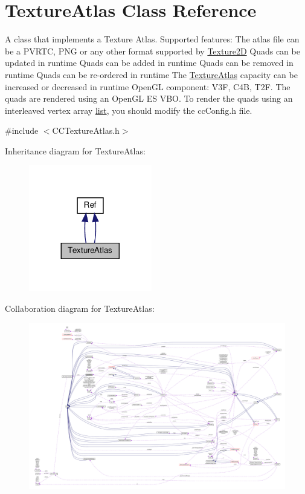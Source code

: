 \hypertarget{classTextureAtlas}{}\section{Texture\+Atlas Class Reference}
\label{classTextureAtlas}


A class that implements a Texture Atlas. Supported features\+: The atlas file can be a P\+V\+R\+TC, P\+NG or any other format supported by \hyperlink{classTexture2D}{Texture2D} Quads can be updated in runtime Quads can be added in runtime Quads can be removed in runtime Quads can be re-\/ordered in runtime The \hyperlink{classTextureAtlas}{Texture\+Atlas} capacity can be increased or decreased in runtime Open\+GL component\+: V3F, C4B, T2F. The quads are rendered using an Open\+GL ES V\+BO. To render the quads using an interleaved vertex array \hyperlink{protocollist-p}{list}, you should modify the cc\+Config.\+h file.  




{\ttfamily \#include $<$C\+C\+Texture\+Atlas.\+h$>$}



Inheritance diagram for Texture\+Atlas\+:
\nopagebreak
\begin{figure}[H]
\begin{center}
\leavevmode
\includegraphics[width=152pt]{classTextureAtlas__inherit__graph}
\end{center}
\end{figure}


Collaboration diagram for Texture\+Atlas\+:
\nopagebreak
\begin{figure}[H]
\begin{center}
\leavevmode
\includegraphics[width=350pt]{classTextureAtlas__coll__graph}
\end{center}
\end{figure}
